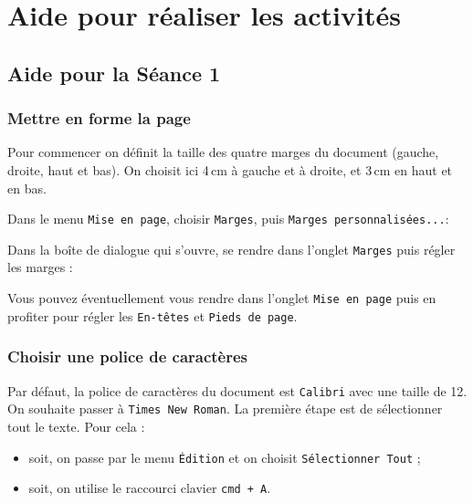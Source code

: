 

\newpage

\section{Aide pour réaliser les activités}
\subsection{\label{correction_texte01}Aide pour la Séance 1}

\subsubsection{Mettre en forme la page}

Pour commencer on définit la taille des quatre marges du document (gauche, droite, haut et bas). On choisit ici 4\,cm à gauche et à droite, et 3\,cm en haut et en bas.

Dans le menu \texttt{Mise en page}, choisir \texttt{Marges}, puis \texttt{Marges personnalisées...}:    


Dans la boîte de dialogue qui s'ouvre, se rendre dans l'onglet \texttt{Marges} puis régler les marges :  


Vous pouvez éventuellement vous rendre dans l'onglet \texttt{Mise en page} puis en profiter pour régler les \texttt{En-têtes} et \texttt{Pieds de page}.











\subsubsection{Choisir une police de caractères}

Par défaut, la police de caractères du document est \texttt{Calibri} avec une taille de 12. On souhaite passer à \texttt{Times New Roman}. La première étape est de sélectionner tout le texte. Pour cela :

\begin{itemize}
\item soit, on passe par le menu \texttt{Édition} et on choisit \texttt{Sélectionner Tout} ;
\item soit, on utilise le raccourci clavier \texttt{cmd + A}.    
\end{itemize}


